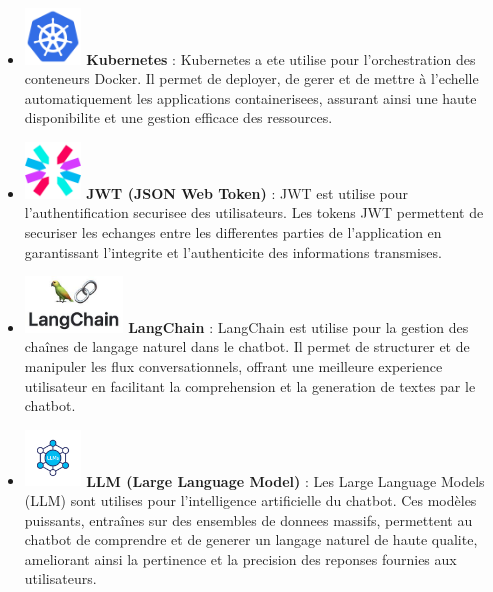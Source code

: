 \documentclass[a4paper, 11pt, openany]{report}
\begin{document}
\begin{itemize}
    \item \includegraphics[height=1.5cm]{images/kubernetes.png} \hspace{5pt} \textbf{Kubernetes} : 
    Kubernetes a ete utilise pour l'orchestration des conteneurs Docker. Il permet de deployer, de gerer et de mettre à l'echelle automatiquement les applications containerisees, assurant ainsi une haute disponibilite et une gestion efficace des ressources.

    \item \includegraphics[height=1.5cm]{images/jwt.png} \hspace{5pt} \textbf{JWT (JSON Web Token)}  : 
    JWT est utilise pour l'authentification securisee des utilisateurs. Les tokens JWT permettent de securiser les echanges entre les differentes parties de l'application en garantissant l'integrite et l'authenticite des informations transmises.


\item \includegraphics[height=1.5cm]{images/langchain.jpeg} \hspace{5pt} \textbf{LangChain}  : 
LangChain est utilise pour la gestion des chaînes de langage naturel dans le chatbot. Il permet de structurer et de manipuler les flux conversationnels, offrant une meilleure experience utilisateur en facilitant la comprehension et la generation de textes par le chatbot.

\item \includegraphics[height=1.5cm]{images/llm.png} \hspace{5pt} \textbf{LLM (Large Language Model)} : 
Les Large Language Models (LLM) sont utilises pour l'intelligence artificielle du chatbot. Ces modèles puissants, entraînes sur des ensembles de donnees massifs, permettent au chatbot de comprendre et de generer un langage naturel de haute qualite, ameliorant ainsi la pertinence et la precision des reponses fournies aux utilisateurs.


\end{itemize}
\end{document}
